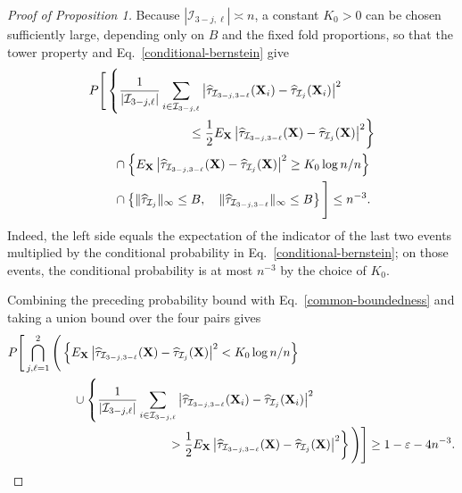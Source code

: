 \documentclass[11pt]{article}
\theoremstyle{referenceplain}
\theoremstyle{referencedefinition}
\theoremstyle{referenceremark}
\begin{document}
\begin{proof}[Proof of Proposition 1]
Because $|\mathcal I_{3-j,\ell}|\asymp n$, a constant $K_0>0$ can be
chosen sufficiently large, depending only on $B$ and the fixed fold
proportions, so that the tower property and
Eq.~\eqref{conditional-bernstein} give
\begin{align*}
&P\Bigg[
\left\{
\frac{1}{|\mathcal I_{3-j,\ell}|}
\sum_{i\in\mathcal I_{3-j,\ell}}
\left|
\widehat\tau_{\mathcal I_{3-j,3-\ell}}(\mathbf X_i)
-\widehat\tau_{\mathcal I_j}(\mathbf X_i)
\right|^2
\right.\\
&\hspace{28mm}\left.
\le
\frac12
E_{\mathbf X}\left|
\widehat\tau_{\mathcal I_{3-j,3-\ell}}(\mathbf X)
-\widehat\tau_{\mathcal I_j}(\mathbf X)
\right|^2
\right\}\\
&\hspace{7mm}\cap
\left\{
E_{\mathbf X}\left|
\widehat\tau_{\mathcal I_{3-j,3-\ell}}(\mathbf X)
-\widehat\tau_{\mathcal I_j}(\mathbf X)
\right|^2
\ge K_0\log n/n
\right\}\\
&\hspace{7mm}\cap
\left\{
\|\widehat\tau_{\mathcal I_j}\|_\infty\le B,\quad
\|\widehat\tau_{\mathcal I_{3-j,3-\ell}}\|_\infty\le B
\right\}
\Bigg]
\le n^{-3}.
\end{align*}
Indeed, the left side equals the expectation of the indicator of the
last two events multiplied by the conditional probability in
Eq.~\eqref{conditional-bernstein}; on those events, the conditional
probability is at most $n^{-3}$ by the choice of $K_0$.

Combining the preceding probability bound with
Eq.~\eqref{common-boundedness} and taking a union bound over the four
pairs gives
\begin{align}
P\Bigg[
\bigcap_{j,\ell=1}^2
\Bigg(
&
\left\{
E_{\mathbf X}\left|
\widehat\tau_{\mathcal I_{3-j,3-\ell}}(\mathbf X)
-\widehat\tau_{\mathcal I_j}(\mathbf X)
\right|^2
<K_0\log n/n
\right\}
\notag\\
&\quad\cup
\left\{
\frac{1}{|\mathcal I_{3-j,\ell}|}
\sum_{i\in\mathcal I_{3-j,\ell}}
\left|
\widehat\tau_{\mathcal I_{3-j,3-\ell}}(\mathbf X_i)
-\widehat\tau_{\mathcal I_j}(\mathbf X_i)
\right|^2
\right.
\notag\\
&\hspace{31mm}\left.
>
\frac12
E_{\mathbf X}\left|
\widehat\tau_{\mathcal I_{3-j,3-\ell}}(\mathbf X)
-\widehat\tau_{\mathcal I_j}(\mathbf X)
\right|^2
\right\}
\Bigg)
\Bigg]
\ge1-\varepsilon-4n^{-3}.
\label{simultaneous-bernstein}
\end{align}


\end{proof}
\end{document}
